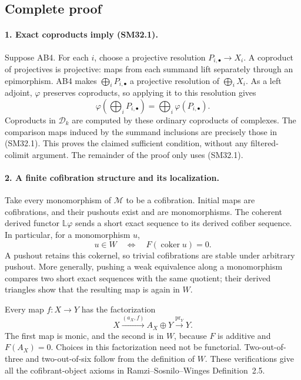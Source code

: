 \subsection{Complete proof}

\paragraph{1. Exact coproducts imply (SM32.1).}
Suppose AB4.  For each \(i\), choose a projective resolution
\(P_{i,\bullet}\to X_i\).  A coproduct of projectives is
projective: maps from each summand lift separately through an
epimorphism.  AB4 makes \(\bigoplus_iP_{i,\bullet}\) a
projective resolution of \(\bigoplus_iX_i\).
As a left adjoint, \(\varphi\) preserves coproducts, so applying
it to this resolution gives
\[
 \varphi\!\left(\bigoplus_iP_{i,\bullet}\right)
                  =\bigoplus_i\varphi(P_{i,\bullet}).
\]
Coproducts in \(\mathcal D_k\) are computed by these ordinary
coproducts of complexes.  The comparison maps induced by the
summand inclusions are precisely those in (SM32.1).  This proves
the claimed sufficient condition, without any filtered-colimit
argument.  The remainder of the proof only uses (SM32.1).

\paragraph{2. A finite cofibration structure and its localization.}
Take every monomorphism of \(\mathcal M\) to be a cofibration.
Initial maps are cofibrations, and their pushouts exist and are
monomorphisms.  The coherent derived functor
\(\mathbb L\varphi\) sends a short exact sequence to its
derived cofiber sequence.  In particular, for a monomorphism
\(u\),
\[
       u\in W\quad\Longleftrightarrow\quad
                       F(\operatorname{coker}u)=0.             \tag{SM32.3}
\]
A pushout retains this cokernel, so trivial cofibrations are
stable under arbitrary pushout.  More generally, pushing a
weak equivalence along a monomorphism compares two short
exact sequences with the same quotient; their derived
triangles show that the resulting map is again in \(W\).

Every map \(f:X\to Y\) has the factorization
\[
 X\xrightarrow{(a_X,f)}A_X\oplus Y
                          \xrightarrow{\operatorname{pr}_Y}Y. \tag{SM32.4}
\]
The first map is monic, and the second is in \(W\), because
\(F\) is additive and \(F(A_X)=0\).  Choices in this
factorization need not be functorial.  Two-out-of-three and
two-out-of-six follow from the definition of \(W\).
These verifications give all the cofibrant-object axioms in
Ramzi--Sosnilo--Winges Definition~2.5.

